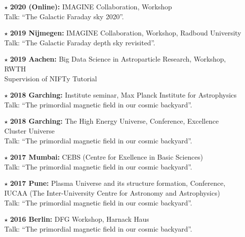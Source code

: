 \documentclass[11pt,a4paper,sans, table, dvipsnames]{moderncv}        %
\begin{document}
\begin{itemize}
\begin{itemize}
    \item[\textcolor{Black}{$\star$}]{\textbf{2020 (Online):} IMAGINE Collaboration, Workshop\\ Talk: ``The Galactic Faraday sky 2020''.}

    \item[\textcolor{Black}{$\star$}]{\textbf{2019 Nijmegen:} IMAGINE Collaboration, Workshop, Radboud University\\ Talk: ``The Galactic Faraday depth sky revisited''.}

    \item[\textcolor{Black}{$\star$}]{\textbf{2019 Aachen:} Big Data Science in Astroparticle Research, Workshop, RWTH \\ Supervision of NIFTy Tutorial}

    \item[\textcolor{Black}{$\star$}]{\textbf{2018 Garching:} Institute seminar, Max Planck Institute for Astrophysics\\ Talk: ``The primordial magnetic field in our cosmic backyard''.}

    \item[\textcolor{Black}{$\star$}]{\textbf{2018 Garching:} The High Energy Universe, Conference, Excellence Cluster Universe \\ Talk: ``The primordial magnetic field in our cosmic backyard''.}

    \item[\textcolor{Black}{$\star$}]{\textbf{2017 Mumbai:} CEBS (Centre for Exellence in Basic
    Sciences) \\ Talk: ``The primordial magnetic field in our cosmic backyard''.}

    \item[\textcolor{Black}{$\star$}]{\textbf{2017 Pune:} Plasma Universe and its structure formation, Conference, IUCAA (The Inter-University Centre for Astronomy and Astrophysics)\\ Talk: ``The primordial magnetic field in our cosmic backyard''.}

    \item[\textcolor{Black}{$\star$}]{\textbf{2016 Berlin:} DFG Workshop, Harnack Haus\\ Talk: ``The primordial magnetic field in our cosmic backyard''.}
  \end{itemize}

\end{itemize}

\vspace{\baselineskip}
\end{document}
